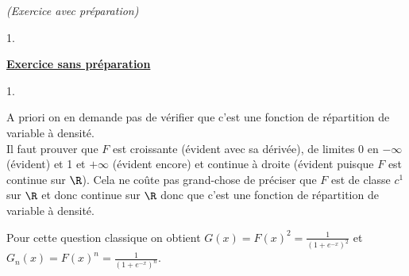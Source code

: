 \documentclass[11pt]{article}%
\begin{document}
\begin{exercice}{\it (Exercice avec préparation)}
\begin{noliste}{1.}
 \end{noliste}
 \noindent \textbf{\underline{Exercice sans préparation}} \\
 \begin{noliste}{1.}
 \setlength{\itemsep}{4mm}
 \item A priori on en demande pas de vérifier que c'est une fonction de
répartition de variable à densité. \\
 Il faut prouver que $F$ est croissante (évident avec sa dérivée), de
limites 0 en $-\infty$ (évident) et 1 et $ + \infty$ (évident encore)
et continue à droite (évident puisque $F$ est continue sur $\R$). Cela
ne coûte pas grand-chose de préciser que $F$ est de classe $c^{1}$ sur
$\R$ et donc continue sur $\R$ donc que c'est une fonction de
répartition de variable à densité. \\
 \item Pour cette question classique on obtient $G(x) = F(x)^{2} =
\frac{1}{ (1 + e^{-x} )^{2}}$ et $G_{n} (x) = F(x)^{n} = \frac{1}{(1 +
e^{-x})^{n}}$. 
 \end{noliste}
 \end{exercice}

 \newpage
\end{document}
